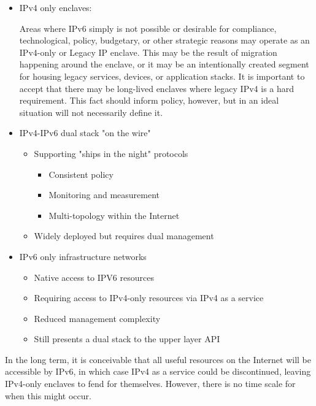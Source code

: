 \documentclass[
]{article}
\providecommand{\tightlist}{%
  \setlength{\itemsep}{0pt}\setlength{\parskip}{0pt}}
\begin{document}
\begin{itemize}
\item
  IPv4 only enclaves:

  Areas where IPv6 simply is not possible or desirable for compliance,
  technological, policy, budgetary, or other strategic reasons may
  operate as an IPv4-only or Legacy IP enclave. This may be the result
  of migration happening around the enclave, or it may be an
  intentionally created segment for housing legacy services, devices, or
  application stacks. It is important to accept that there may be
  long-lived enclaves where legacy IPv4 is a hard requirement. This fact
  should inform policy, however, but in an ideal situation will not
  necessarily define it.
\item
  IPv4-IPv6 dual stack "on the wire"

  \begin{itemize}
  \tightlist
  \item
    Supporting "ships in the night" protocols

    \begin{itemize}
    \tightlist
    \item
      Consistent policy
    \item
      Monitoring and measurement
    \item
      Multi-topology within the Internet
    \end{itemize}
  \item
    Widely deployed but requires dual management
  \end{itemize}
\item
  IPv6 only infrastructure networks

  \begin{itemize}
  \tightlist
  \item
    Native access to IPV6 resources
  \item
    Requiring access to IPv4-only resources via IPv4 as a service
  \item
    Reduced management complexity
  \item
    Still presents a dual stack to the upper layer API
  \end{itemize}
\end{itemize}

In the long term, it is conceivable that all useful resources on the
Internet will be accessible by IPv6, in which case IPv4 as a service
could be discontinued, leaving IPv4-only enclaves to fend for
themselves. However, there is no time scale for when this might occur.
\end{document}

